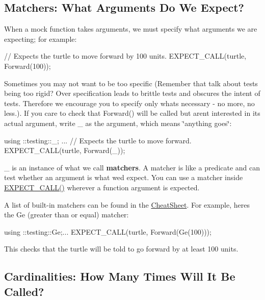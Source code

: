 \subsection*{Matchers\+: What Arguments Do We Expect?}

When a mock function takes arguments, we must specify what arguments we are expecting; for example\+:


\begin{DoxyCode}
// Expects the turtle to move forward by 100 units.
EXPECT\_CALL(turtle, Forward(100));
\end{DoxyCode}


Sometimes you may not want to be too specific (Remember that talk about tests being too rigid? Over specification leads to brittle tests and obscures the intent of tests. Therefore we encourage you to specify only what\textquotesingle{}s necessary -\/ no more, no less.). If you care to check that {\ttfamily Forward()} will be called but aren\textquotesingle{}t interested in its actual argument, write {\ttfamily \+\_\+} as the argument, which means \char`\"{}anything goes\char`\"{}\+:


\begin{DoxyCode}
using ::testing::\_;
...
// Expects the turtle to move forward.
EXPECT\_CALL(turtle, Forward(\_));
\end{DoxyCode}


{\ttfamily \+\_\+} is an instance of what we call {\bfseries matchers}. A matcher is like a predicate and can test whether an argument is what we\textquotesingle{}d expect. You can use a matcher inside {\ttfamily \hyperlink{gmock-spec-builders_8h_a535a6156de72c1a2e25a127e38ee5232}{E\+X\+P\+E\+C\+T\+\_\+\+C\+A\+L\+L()}} wherever a function argument is expected.

A list of built-\/in matchers can be found in the \hyperlink{v1__7_2CheatSheet_8md}{Cheat\+Sheet}. For example, here\textquotesingle{}s the {\ttfamily Ge} (greater than or equal) matcher\+:


\begin{DoxyCode}
using ::testing::Ge;...
EXPECT\_CALL(turtle, Forward(Ge(100)));
\end{DoxyCode}


This checks that the turtle will be told to go forward by at least 100 units.

\subsection*{Cardinalities\+: How Many Times Will It Be Called?}

